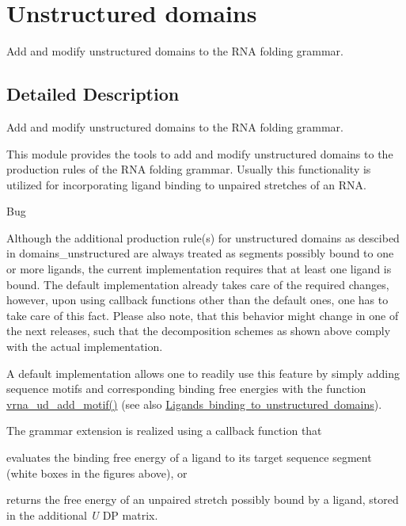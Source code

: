 \hypertarget{group__domains__up}{}\section{Unstructured domains}
\label{group__domains__up}


Add and modify unstructured domains to the R\+NA folding grammar.  




\subsection{Detailed Description}
Add and modify unstructured domains to the R\+NA folding grammar. 

This module provides the tools to add and modify unstructured domains to the production rules of the R\+NA folding grammar. Usually this functionality is utilized for incorporating ligand binding to unpaired stretches of an R\+NA.

\begin{DoxyRefDesc}{Bug}
\item[\mbox{\hyperlink{bug__bug000002}{Bug}}]Although the additional production rule(s) for unstructured domains as descibed in domains\+\_\+unstructured are always treated as \textquotesingle{}segments possibly bound to one or more ligands\textquotesingle{}, the current implementation requires that at least one ligand is bound. The default implementation already takes care of the required changes, however, upon using callback functions other than the default ones, one has to take care of this fact. Please also note, that this behavior might change in one of the next releases, such that the decomposition schemes as shown above comply with the actual implementation.\end{DoxyRefDesc}


A default implementation allows one to readily use this feature by simply adding sequence motifs and corresponding binding free energies with the function \mbox{\hyperlink{group__domains__up_gaec0c3313fb2951946614f920d289829a}{vrna\+\_\+ud\+\_\+add\+\_\+motif()}} (see also \mbox{\hyperlink{group__ligands__up}{Ligands binding to unstructured domains}}).

The grammar extension is realized using a callback function that
\begin{DoxyItemize}
\item evaluates the binding free energy of a ligand to its target sequence segment (white boxes in the figures above), or
\item returns the free energy of an unpaired stretch possibly bound by a ligand, stored in the additional {\itshape U} DP matrix.
\end{DoxyItemize}

